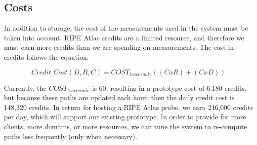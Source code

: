 \subsection{Costs}
In addition to storage, the cost of the measurements used in the system must 
be taken into account.  RIPE Atlas credits are a limited resource, and therefore 
we must earn more credits than we are spending on measurements.  The cost 
in credits follows the equation:

\[Credit\_Cost(D,R,C) = COST_{traceroute}((C x R) + (C x D))\]

Currently, the $COST_{traceroute}$ is 60, resulting in a prototype cost of 6,180 
credits, but because these paths are updated each hour, then 
the daily credit cost is 148,320 credits.  In return for hosting a RIPE Atlas 
probe, we earn 216,000 credits per day, which will support our existing 
prototype.  In order to provide for more clients, more domains, or more 
resources, we can tune the system to re-compute paths less frequently (only when necessary).
